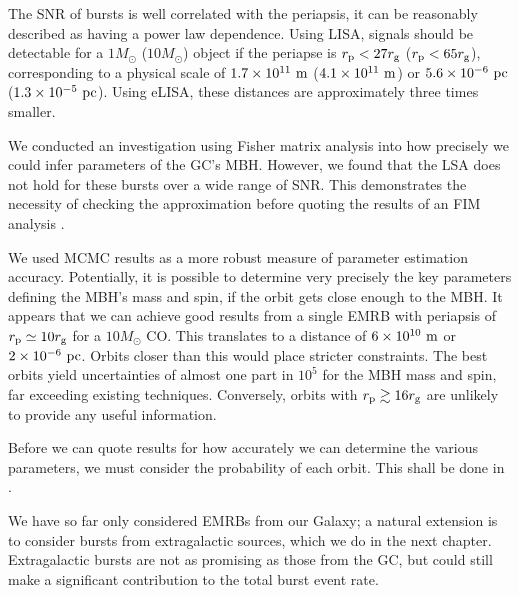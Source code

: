 The SNR of bursts is well correlated with the periapsis, it can be reasonably described as having a power law dependence. Using LISA, signals should be detectable for a $1 M_\odot$ ($10 M_\odot$) object if the periapse is $r_\mathrm{p} < 27 r_\mathrm{g}$ ($r_\mathrm{p} < 65 r_\mathrm{g}$), corresponding to a physical scale of $1.7 \times 10^{11}~\mathrm{m}$ ($4.1 \times 10^{11}~\mathrm{m}$) or $5.6 \times 10^{-6}~\mathrm{pc}$ ($1.3 \times 10^{-5}~\mathrm{pc}$). Using eLISA, these distances are approximately three times smaller.

We conducted an investigation using Fisher matrix analysis into how precisely we could infer parameters of the GC's MBH. However, we found that the LSA does not hold for these bursts over a wide range of SNR. This demonstrates the necessity of checking the approximation before quoting the results of an FIM analysis \citep{Vallisneri2008}.

We used MCMC results as a more robust measure of parameter estimation accuracy. Potentially, it is possible to determine very precisely the key parameters defining the MBH's mass and spin, if the orbit gets close enough to the MBH. It appears that we can achieve good results from a single EMRB with periapsis of $r_\mathrm{p} \simeq 10 r_\mathrm{g}$ for a $10 M_\odot$ CO. This translates to a distance of $6 \times 10^{10}~\mathrm{m}$ or $2 \times 10^{-6}~\mathrm{pc}$. Orbits closer than this would place stricter constraints. The best orbits yield uncertainties of almost one part in $10^5$ for the MBH mass and spin, far exceeding existing techniques. Conversely, orbits with $r_\mathrm{p} \gtrsim 16 r_\mathrm{g}$ are unlikely to provide any useful information.

Before we can quote results for how accurately we can determine the various parameters, we must consider the probability of each orbit. This shall be done in .

We have so far only considered EMRBs from our Galaxy; a natural extension is to consider bursts from extragalactic sources, which we do in the next chapter. Extragalactic bursts are not as promising as those from the GC, but could still make a significant contribution to the total burst event rate. 
